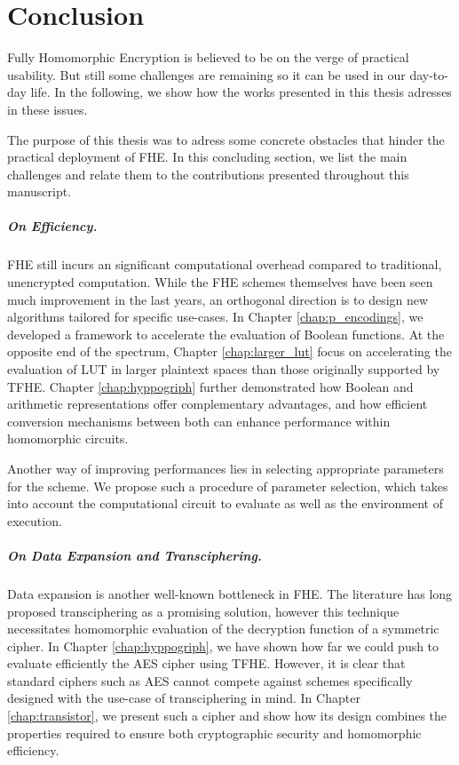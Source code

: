 \chapter*{Conclusion}

Fully Homomorphic Encryption is believed to be on the verge of practical usability. But still some challenges are remaining so it can be used in our day-to-day life. In the following, we show how the works presented in this thesis adresses in these issues.

The purpose of this thesis was to adress some concrete obstacles that hinder the practical deployment of \gls{FHE}. In this concluding section, we list the main challenges and relate them to the contributions presented throughout this manuscript.

\paragraph{On Efficiency.}

\gls{FHE} still incurs an significant computational overhead compared to traditional, unencrypted computation. While the \gls{FHE} schemes themselves have been seen much improvement in the last years, an orthogonal direction is to design new algorithms tailored for specific use-cases. In Chapter \ref{chap:p_encodings}, we developed a framework to accelerate the evaluation of Boolean functions. At the opposite end of the spectrum, Chapter \ref{chap:larger_lut} focus on accelerating the evaluation of \gls{LUT} in larger plaintext spaces than those originally supported by \gls{TFHE}. Chapter \ref{chap:hyppogriph} further demonstrated how Boolean and arithmetic representations offer complementary advantages, and how efficient conversion mechanisms between both can enhance performance within homomorphic circuits. 

Another way of improving performances lies in selecting appropriate parameters for the scheme. We propose such a procedure of parameter selection, which takes into account the computational circuit to evaluate as well as the environment of execution.


\paragraph{On Data Expansion and Transciphering.}


Data expansion is another well-known bottleneck in \gls{FHE}. The literature has long proposed transciphering as a promising solution, however this technique necessitates homomorphic evaluation of the decryption function of a symmetric cipher. In Chapter \ref{chap:hyppogriph}, we have shown how far we could push to evaluate efficiently the \gls{AES} cipher using \gls{TFHE}. However, it is clear that standard ciphers such as \gls{AES} cannot compete against schemes specifically designed with the use-case of transciphering in mind. In Chapter \ref{chap:transistor}, we present such a cipher and show how its design combines the properties required to ensure both cryptographic security and homomorphic efficiency. 




